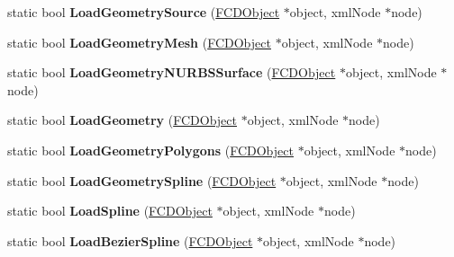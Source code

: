 \begin{DoxyCompactItemize}
\item 
\hypertarget{classFArchiveXML_abd6b7eedb5a38c372c868d00584803cc}{
static bool {\bfseries LoadGeometrySource} (\hyperlink{classFCDObject}{FCDObject} $\ast$object, xmlNode $\ast$node)}
\label{classFArchiveXML_abd6b7eedb5a38c372c868d00584803cc}

\item 
\hypertarget{classFArchiveXML_a2efcffe1c9d1a5995041c1c67e4c8880}{
static bool {\bfseries LoadGeometryMesh} (\hyperlink{classFCDObject}{FCDObject} $\ast$object, xmlNode $\ast$node)}
\label{classFArchiveXML_a2efcffe1c9d1a5995041c1c67e4c8880}

\item 
\hypertarget{classFArchiveXML_a7cbb70e74b9798c3b5522da0fb7fafb8}{
static bool {\bfseries LoadGeometryNURBSSurface} (\hyperlink{classFCDObject}{FCDObject} $\ast$object, xmlNode $\ast$node)}
\label{classFArchiveXML_a7cbb70e74b9798c3b5522da0fb7fafb8}

\item 
\hypertarget{classFArchiveXML_aae7d1bddc6e15d3dce05b47ae15cb4d2}{
static bool {\bfseries LoadGeometry} (\hyperlink{classFCDObject}{FCDObject} $\ast$object, xmlNode $\ast$node)}
\label{classFArchiveXML_aae7d1bddc6e15d3dce05b47ae15cb4d2}

\item 
\hypertarget{classFArchiveXML_a0bc5ec838d4bb7b50952d317b4a1bbf0}{
static bool {\bfseries LoadGeometryPolygons} (\hyperlink{classFCDObject}{FCDObject} $\ast$object, xmlNode $\ast$node)}
\label{classFArchiveXML_a0bc5ec838d4bb7b50952d317b4a1bbf0}

\item 
\hypertarget{classFArchiveXML_a2333e909f2b1bcc4b5c9434f205f1750}{
static bool {\bfseries LoadGeometrySpline} (\hyperlink{classFCDObject}{FCDObject} $\ast$object, xmlNode $\ast$node)}
\label{classFArchiveXML_a2333e909f2b1bcc4b5c9434f205f1750}

\item 
\hypertarget{classFArchiveXML_a624aeb310f4820e643e240d088a3151a}{
static bool {\bfseries LoadSpline} (\hyperlink{classFCDObject}{FCDObject} $\ast$object, xmlNode $\ast$node)}
\label{classFArchiveXML_a624aeb310f4820e643e240d088a3151a}

\item 
\hypertarget{classFArchiveXML_abcb8278daa17a482a7c4a396b894d6bb}{
static bool {\bfseries LoadBezierSpline} (\hyperlink{classFCDObject}{FCDObject} $\ast$object, xmlNode $\ast$node)}
\label{classFArchiveXML_abcb8278daa17a482a7c4a396b894d6bb}


\end{DoxyCompactItemize}
